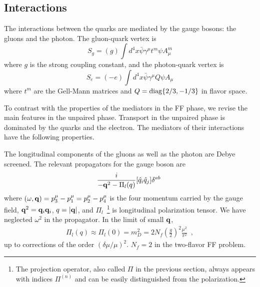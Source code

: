 \documentclass[10pt, aps, prd, superscriptaddress, nofootinbib, 
               amsmath, amssymb, twocolumn,
               preprintnumbers, showpacs,
               raggedbottom,
               floatfix]{revtex4-1}
\newcommand{\bfq}{{\bf{q}}}
\newcommand{\diag}{{\rm{diag}}}
\begin{document}
\subsection{Interactions}
\label{sec:interactions}
The interactions between the quarks are mediated by the gauge bosons: the
gluons and the photon. The gluon-quark vertex is 
\begin{equation}
S_{g} = (g)\int d^4 x \bar{\psi}\gamma^\mu t^m\psi A_\mu^m
\end{equation}
where $g$ is the strong coupling constant, and the photon-quark vertex is 
\begin{equation}
S_{e} = (-e)\int d^4 x \bar{\psi}\gamma^\mu Q\psi A_\mu
\end{equation}
where $t^m$ are the Gell-Mann matrices and $Q=\diag\{2/3,-1/3\}$ in flavor
space. 

To contrast with the properties of the mediators in the FF phase, we revise the
main features in the unpaired phase. Transport in the unpaired phase is dominated by 
the quarks and the electron. The mediators of their interactions have the
following properties.

The longitudinal components of the gluons as well as the photon are Debye
screened. The relevant propagators for the gauge boson are
\begin{equation}
\begin{split}
\frac{i}{-\bfq^2-\Pi_l(q)}[\hat{q}_i\hat{q}_j]\delta^{ab}~\label{eq:propL}
\end{split}
\end{equation}
where $(\omega,{\bf{q}})=p_3^\mu-p_1^\mu=p_2^\mu-p_4^\mu$ is the four momentum carried by the gauge field,
$\bfq^2=\bfq_i\bfq_i$, $q=|\bfq|$, and $\Pi_l$~\footnote{The projection operator, also called $\Pi$
in the previous section, always appears with indices $\Pi^{(n)}$ and can be easily distinguished from
the polarization.} is longitudinal polarization tensor. We have
neglected $\omega^2$ in the propagator. In the limit of small $\bfq$,
\begin{equation}
\begin{split}
\Pi_l(q) \approx \Pi_l(0) = m_D^2 = 2N_f (\frac{g}{2})^2
\frac{\mu^2}{\pi^2}~\label{eq:mD2SUN_f}\;,
\end{split}
\end{equation}
up to corrections of the order $(\delta\mu/\mu)^2$. $N_f=2$ in the two-flavor 
FF problem. 
\end{document}
